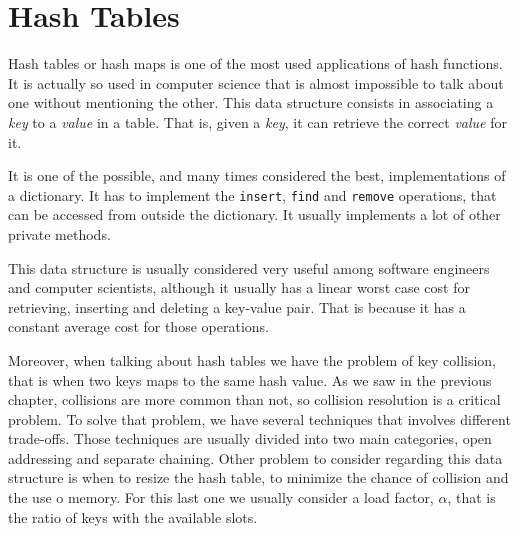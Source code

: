 
\chapter{Hash Tables}
\label{cap:Hash Tables}



Hash tables or hash maps is one of the most used applications of hash functions. It is actually so used in computer science that is almost impossible to talk about one without mentioning the other. This data structure consists in associating a \textit{key} to a \textit{value} in a table. That is, given a \textit{key}, it can retrieve the correct \textit{value} for it.

It is one of the possible, and many times considered the best, implementations of a dictionary. It has to implement the \texttt{insert}, \texttt{find} and \texttt{remove} operations, that can be accessed from outside the dictionary. It usually implements a lot of other private methods. 

This data structure is usually considered very useful among software engineers and computer scientists, although it usually has a linear worst case cost for retrieving, inserting and deleting a key-value pair. That is because it has a constant average cost for those operations.

Moreover, when talking about hash tables we have the problem of key collision, that is when two keys maps to the same hash value. As we saw in the previous chapter, collisions are more common than not, so collision resolution is a critical problem. To solve that problem, we have several techniques that involves different trade-offs. Those techniques are usually divided into two main categories, open addressing and separate chaining. Other problem to consider regarding this data structure is when to resize the hash table, to minimize the chance of collision and the use o memory. For this last one we usually consider a load factor, \( \alpha \), that is the ratio of keys with the available slots.

